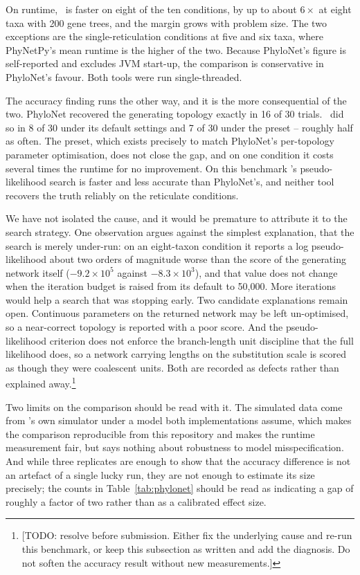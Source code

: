 On runtime, \phynetpy\ is faster on eight of the ten conditions, by up to about
$6\times$ at eight taxa with 200 gene trees, and the margin grows with problem
size. The two exceptions are the single-reticulation conditions at five and six
taxa, where PhyNetPy's mean runtime is the higher of the two. Because PhyloNet's
figure is self-reported and excludes JVM start-up, the comparison is conservative
in PhyloNet's favour. Both tools were run single-threaded.

The accuracy finding runs the other way, and it is the more consequential of the
two. PhyloNet recovered the generating topology exactly in 16 of 30 trials.
\phynetpy\ did so in 8 of 30 under its default settings and 7 of 30 under the
 preset -- roughly half as often. The preset, which exists
precisely to match PhyloNet's per-topology parameter optimisation, does not close
the gap, and on one condition it costs several times the runtime for no
improvement. On this benchmark \phynetpy's pseudo-likelihood search is faster and
less accurate than PhyloNet's, and neither tool recovers the truth reliably on
the reticulate conditions.

We have not isolated the cause, and it would be premature to attribute it to the
search strategy. One observation argues against the simplest explanation, that
the search is merely under-run: on an eight-taxon condition it reports a log
pseudo-likelihood about two orders of magnitude worse than the score of the
generating network itself ($-9.2 \times 10^5$ against $-8.3 \times 10^3$), and
that value does not change when the iteration budget is raised from its default
to 50{,}000. More iterations would help a search that was stopping early. Two
candidate explanations remain open. Continuous parameters on the returned network
may be left un-optimised, so a near-correct topology is reported with a poor
score. And the pseudo-likelihood criterion does not enforce the branch-length
unit discipline that the full likelihood does, so a network carrying lengths on
the substitution scale is scored as though they were coalescent units. Both
are recorded as defects rather than explained away.\footnote{[TODO: resolve
before submission. Either fix the underlying cause and re-run this benchmark, or
keep this subsection as written and add the diagnosis. Do not soften the accuracy
result without new measurements.]}

Two limits on the comparison should be read with it. The simulated data come from
\phynetpy's own simulator under a model both implementations assume, which makes
the comparison reproducible from this repository and makes the runtime
measurement fair, but says nothing about robustness to model misspecification.
And while three replicates are enough to show that the accuracy difference is not
an artefact of a single lucky run, they are not enough to estimate its size
precisely; the counts in Table~\ref{tab:phylonet} should be read as indicating a
gap of roughly a factor of two rather than as a calibrated effect size.

